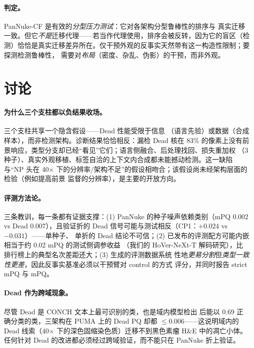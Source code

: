 \documentclass[11pt]{article}
\begin{document}
\paragraph{判定。}PanNuke-CF 是有效的\emph{分型压力测试}：它对各架构分型鲁棒性的排序与
真实迁移一致。但它\emph{不是}迁移代理——若当作代理使用，排序会被反转，因为它的盲区（检
测）恰恰是真实迁移差异所在。仅干预外观的反事实天然带有这一构造性限制；要探测检测鲁棒性，
需要对\emph{布局}（密度、杂乱、伪影）的干预，而非外观。

\section{讨论}
\label{sec:discussion}

\paragraph{为什么三个支柱都以负结果收场。}三个支柱共享一个隐含假设——Dead 性能受限于信息
（语言先验）或数据（合成样本），而非检测架构。诊断结果恰恰相反：漏检 Dead 核在 83\%
的像素上没有前景响应，类型分支却已经“看见”它们；语言侧融合、后处理找回、损失重加权
（3 种子）、真实外观移植、标签自洽的上下文内合成都未能撼动检测。这一缺陷与“NP 头在
40$\times$ 下的分辨率/架构不足”的假设相吻合；该假设尚未经架构层面的检验（例如提高前景
监督的分辨率），是主要的开放方向。

\paragraph{评测方法论。}三条教训，每一条都有证据支撑：(1) PanNuke 的种子噪声依赖类别（mPQ 0.002 vs
Dead 0.007），且验证折的 Dead 信号可能与测试相反（CP1：$+0.024$ vs $-0.031$）——单种子、
单折的 Dead 结论不可信；(2) 已发布的评测配方可能内嵌相当于约 0.02 mPQ 的测试侧调参收益
（我们的 HoVer-NeXt-T 解码研究），比排行榜上的典型名次差距还大；(3) 生成的评测数据系统
性地\emph{更易分割}但\emph{类型一致性更差}，因此反事实基准必须以干预臂对 control 的方式
评分，并同时报告 strict mPQ 与 mPQ。

\paragraph{Dead 作为跨域现象。}尽管 Dead 是 CONCH 文本上最可识别的类，也是域内模型检出
后能以 0.69 正确分类的类，三架构在 PUMA 上的 Dead PQ 却都 $\le$0.006——这说明域内的
Dead 线索（40$\times$ 下的深色固缩染色质）迁移不到黑色素瘤 H\&E 中的凋亡小体。任何针对
Dead 的改进都必须经过跨域验证，而不能只在 PanNuke 折上验证。
\end{document}
